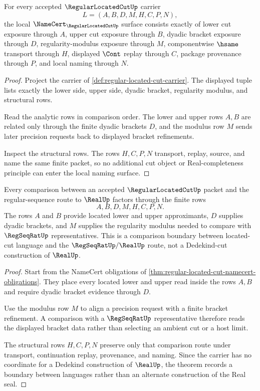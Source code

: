 \begin{theorem}
\label{thm:regular-located-cut-namecert-obligations}
For every accepted $\RegularLocatedCutUp$ carrier
$$
L=(A,B,D,M,H,C,P,N),
$$
the local $\NameCert_{\RegularLocatedCutUp}$ surface consists exactly of lower cut exposure through $A$, upper cut exposure through $B$, dyadic bracket exposure through $D$, regularity-modulus exposure through $M$, componentwise $\hsame$ transport through $H$, displayed $\Cont$ replay through $C$, package provenance through $P$, and local naming through $N$.
\end{theorem}
\begin{proof}
Project the carrier of \autoref{def:regular-located-cut-carrier}. The displayed tuple lists exactly the lower side, upper side, dyadic bracket, regularity modulus, and structural rows.

Read the analytic rows in comparison order. The lower and upper rows $A,B$ are related only through the finite dyadic brackets $D$, and the modulus row $M$ sends later precision requests back to displayed bracket refinements.

Inspect the structural rows. The rows $H,C,P,N$ transport, replay, source, and name the same finite packet, so no additional cut object or Real-completeness principle can enter the local naming surface.
\end{proof}

\begin{theorem}
\label{thm:regular-located-cut-regseqrat-boundary}
Every comparison between an accepted $\RegularLocatedCutUp$ packet and the regular-sequence route to $\RealUp$ factors through the finite rows
$$
A,B,D,M,H,C,P,N.
$$
The rows $A$ and $B$ provide located lower and upper approximants, $D$ supplies dyadic brackets, and $M$ supplies the regularity modulus needed to compare with $\RegSeqRatUp$ representatives. This is a comparison boundary between located-cut language and the $\RegSeqRatUp/\RealUp$ route, not a Dedekind-cut construction of $\RealUp$.
\end{theorem}
\begin{proof}
Start from the NameCert obligations of \autoref{thm:regular-located-cut-namecert-obligations}. They place every located lower and upper read inside the rows $A,B$ and require dyadic bracket evidence through $D$.

Use the modulus row $M$ to align a precision request with a finite bracket refinement. A comparison with a $\RegSeqRatUp$ representative therefore reads the displayed bracket data rather than selecting an ambient cut or a host limit.

The structural rows $H,C,P,N$ preserve only that comparison route under transport, continuation replay, provenance, and naming. Since the carrier has no coordinate for a Dedekind construction of $\RealUp$, the theorem records a boundary between languages rather than an alternate construction of the Real seal.
\end{proof}

